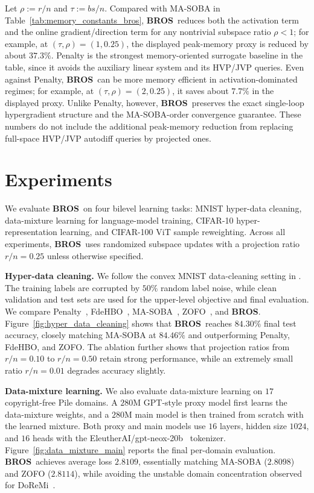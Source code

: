 \documentclass{pkumelon}
\theoremstyle{plain}
\newcommand{\oursname}{\textnormal{\textbf{BROS}}}
\newcommand{\ours}{\oursname\ }
\newcommand{\ourslast}{\oursname}
\begin{document}
Let $\rho:=r/n$ and $\tau:=bs/n$. Compared with MA-SOBA in Table~\ref{tab:memory_constants_bros}, \ours reduces both the activation term and the online gradient/direction term for any nontrivial subspace ratio $\rho<1$; for example, at $(\tau,\rho)=(1,0.25)$, the displayed peak-memory proxy is reduced by about $37.3\%$. Penalty is the strongest memory-oriented surrogate baseline in the table, since it avoids the auxiliary linear system and its HVP/JVP queries. Even against Penalty, \ours can be more memory efficient in activation-dominated regimes; for example, at $(\tau,\rho)=(2,0.25)$, it saves about $7.7\%$ in the displayed proxy. Unlike Penalty, however, \ours preserves the exact single-loop hypergradient structure and the MA-SOBA-order convergence guarantee. These numbers do not include the additional peak-memory reduction from replacing full-space HVP/JVP autodiff queries by projected ones.



\section{Experiments}
We evaluate \ours on four bilevel learning tasks: MNIST hyper-data cleaning, data-mixture learning for language-model training, CIFAR-10 hyper-representation learning, and CIFAR-100 ViT sample reweighting. Across all experiments, \ours uses randomized subspace updates with a projection ratio $r/n=0.25$ unless otherwise specified.

\textbf{Hyper-data cleaning.} We follow the convex MNIST data-cleaning setting in \citep{shaban2019truncated}. The training labels are corrupted by $50\%$ random label noise, while clean validation and test sets are used for the upper-level objective and final evaluation. We compare Penalty~\citep{mehra2021penalty}, FdeHBO~\citep{yang2023achieving}, MA-SOBA~\citep{chen2024optimal}, ZOFO~\citep{shirkavand2025bilevel}, and \ourslast. Figure~\ref{fig:hyper_data_cleaning} shows that \ours reaches $84.30\%$ final test accuracy, closely matching MA-SOBA at $84.46\%$ and outperforming Penalty, FdeHBO, and ZOFO. The ablation further shows that projection ratios from $r/n = 0.10$ to $r/n = 0.50$ retain strong performance, while an extremely small ratio $r/n=0.01$ degrades accuracy slightly.

\textbf{Data-mixture learning.} We also evaluate data-mixture learning on $17$ copyright-free Pile domains. A $280$M GPT-style proxy model first learns the data-mixture weights, and a $280$M main model is then trained from scratch with the learned mixture. Both proxy and main models use $16$ layers, hidden size $1024$, and $16$ heads with the EleutherAI/gpt-neox-20b~\cite{black2022gpt} tokenizer. Figure~\ref{fig:data_mixture_main} reports the final per-domain evaluation. \ours achieves average loss $2.8109$, essentially matching MA-SOBA ($2.8098$) and ZOFO ($2.8114$), while avoiding the unstable domain concentration observed for DoReMi~\cite{xie2023doremi}.
\end{document}
